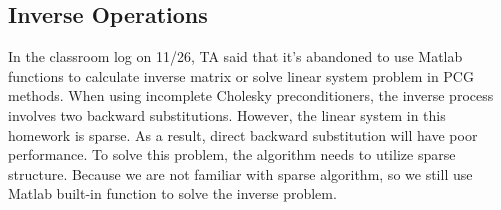 \documentclass{article}
\begin{document}
\subsection{Inverse Operations}
In the classroom log on 11/26, TA said that it's abandoned to use Matlab functions to calculate inverse matrix or solve linear system problem in PCG methods. When using incomplete Cholesky preconditioners, the inverse process involves two backward substitutions. However, the linear system in this homework is sparse. As a result, direct backward substitution will have poor performance. To solve this problem, the algorithm needs to utilize sparse structure. Because we are not familiar with sparse algorithm, so we still use Matlab built-in function to solve the inverse problem.



\newpage
\renewcommand\refname{Reference}


\end{document}
